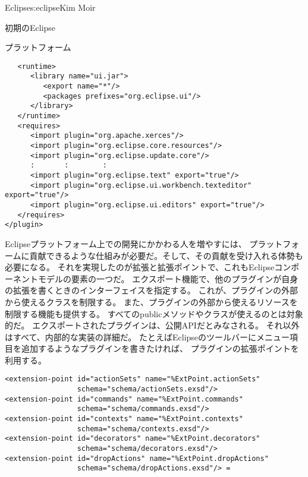 \begin{aosachapter}{Eclipse}{s:eclipse}{Kim Moir}
\begin{aosasect1}{初期のEclipse}
\begin{aosasect2}{プラットフォーム}
\begin{verbatim}
   <runtime>
      <library name="ui.jar">
         <export name="*"/>
         <packages prefixes="org.eclipse.ui"/>
      </library>
   </runtime>
   <requires>
      <import plugin="org.apache.xerces"/>
      <import plugin="org.eclipse.core.resources"/>
      <import plugin="org.eclipse.update.core"/>
      :       :        :
      <import plugin="org.eclipse.text" export="true"/>
      <import plugin="org.eclipse.ui.workbench.texteditor" export="true"/>
      <import plugin="org.eclipse.ui.editors" export="true"/>
   </requires>
</plugin>
\end{verbatim}

Eclipseプラットフォーム上での開発にかかわる人を増やすには、
プラットフォームに貢献できるような仕組みが必要だ。そして、その貢献を受け入れる体勢も必要になる。
それを実現したのが拡張と拡張ポイントで、これもEclipseコンポーネントモデルの要素の一つだ。
エクスポート機能で、他のプラグインが自身の拡張を書くときのインターフェイスを指定する。
これが、プラグインの外部から使えるクラスを制限する。
また、プラグインの外部から使えるリソースを制限する機能も提供する。
すべてのpublicメソッドやクラスが使えるのとは対象的だ。
エクスポートされたプラグインは、公開APIだとみなされる。
それ以外はすべて、内部的な実装の詳細だ。
たとえばEclipseのツールバーにメニュー項目を追加するようなプラグインを書きたければ、
プラグインの拡張ポイントを利用する。

\scriptsize
\begin{verbatim}
<extension-point id="actionSets" name="%ExtPoint.actionSets"
                 schema="schema/actionSets.exsd"/>
<extension-point id="commands" name="%ExtPoint.commands"
                 schema="schema/commands.exsd"/>
<extension-point id="contexts" name="%ExtPoint.contexts"
                 schema="schema/contexts.exsd"/>
<extension-point id="decorators" name="%ExtPoint.decorators"
                 schema="schema/decorators.exsd"/>
<extension-point id="dropActions" name="%ExtPoint.dropActions"
                 schema="schema/dropActions.exsd"/> =
\end{verbatim}
\normalsize


\end{aosasect2}
\end{aosasect1}
\end{aosachapter}

